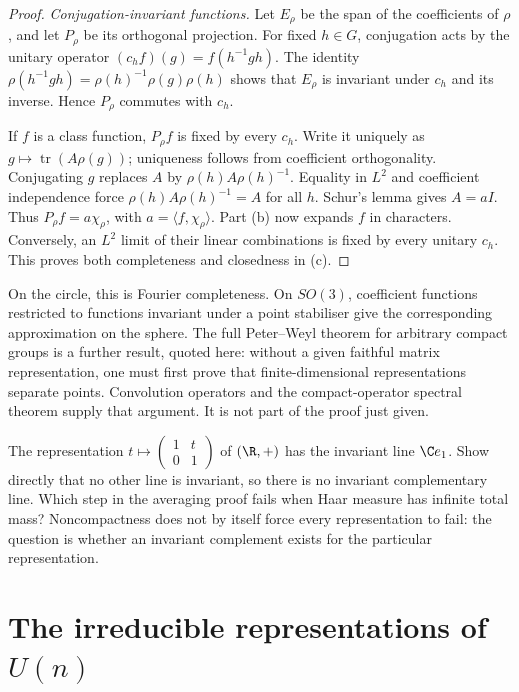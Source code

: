 \begin{proof}
\emph{Conjugation-invariant functions.} Let $E_\rho$ be the span of the coefficients of $\rho$, and let $P_\rho$ be its orthogonal projection. For fixed $h\in G$, conjugation acts by the unitary operator
$(c_hf)(g)=f(h^{-1}gh)$.
The identity $\rho(h^{-1}gh)=\rho(h)^{-1}\rho(g)\rho(h)$ shows that $E_\rho$ is invariant under $c_h$ and its inverse. Hence $P_\rho$ commutes with $c_h$.

If $f$ is a class function, $P_\rho f$ is fixed by every $c_h$. Write it uniquely as $g\mapsto\operatorname{tr}(A\rho(g))$; uniqueness follows from coefficient orthogonality. Conjugating $g$ replaces $A$ by $\rho(h)A\rho(h)^{-1}$. Equality in $L^2$ and coefficient independence force
$\rho(h)A\rho(h)^{-1}=A$ for all $h$.
Schur's lemma gives $A=aI$. Thus $P_\rho f=a\chi_\rho$, with $a=\langle f,\chi_\rho\rangle$. Part (b) now expands $f$ in characters. Conversely, an $L^2$ limit of their linear combinations is fixed by every unitary $c_h$. This proves both completeness and closedness in (c).
\end{proof}

On the circle, this is Fourier completeness. On $SO(3)$, coefficient functions restricted to functions invariant under a point stabiliser give the corresponding approximation on the sphere. The full Peter--Weyl theorem for arbitrary compact groups is a further result, quoted here: without a given faithful matrix representation, one must first prove that finite-dimensional representations separate points. Convolution operators and the compact-operator spectral theorem supply that argument. It is not part of the proof just given.

\begin{think}
The representation $t\mapsto\begin{pmatrix}1&t\\0&1\end{pmatrix}$ of $(\R,+)$ has the invariant line $\C e_1$. Show directly that no other line is invariant, so there is no invariant complementary line. Which step in the averaging proof fails when Haar measure has infinite total mass? Noncompactness does not by itself force every representation to fail: the question is whether an invariant complement exists for the particular representation.
\end{think}

\section{The irreducible representations of \texorpdfstring{$U(n)$}{U(n)}}

